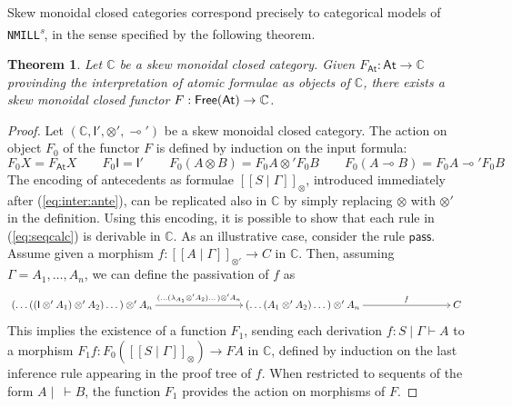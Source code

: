 \documentclass[submission,copyright,creativecommons]{eptcs}
\newtheorem{theorem}{Theorem}[section]
\theoremstyle{definition}
\newcommand{\ldbc}{[\![}
\newcommand{\rdbc}{]\!]}
\newcommand{\pass}{\mathsf{pass}}
\newcommand{\ot}{\otimes}
\newcommand{\lolli}{\multimap}
\newcommand{\I}{\mathsf{I}}
\newcommand{\NMILL}{\texttt{NMILL}}
\newcommand{\SkNMILL}{\NMILL\textsuperscript{\textit{s}}}
\newcommand{\FSkMCC}{\textsf{Free}}
\begin{document}
Skew monoidal closed categories correspond precisely to categorical models of \SkNMILL, in the sense specified by the following theorem.
\begin{theorem}\label{thm:models}
  Let $\mathbb{C}$ be a skew monoidal closed category. Given $F_{\mathsf{At}} : \mathsf{At} \rightarrow \mathbb{C}$ provinding the interpretation of atomic formulae as objects of $\mathbb{C}$, there exists a skew monoidal closed functor $F : \text{\FSkMCC}(\mathsf{At}) \rightarrow \mathbb{C}$.
\end{theorem}
\begin{proof}
  Let $(\mathbb{C} , \I' , \ot' , \lolli')$ be a skew monoidal closed category.
  The action on object $F_0$ of the functor $F$ is defined by induction on the input formula:
  \begin{equation*}
    F_0X = F_{\mathsf{At}}X
    \qquad
    F_0\I = \I'
    \qquad
    F_0(A \ot B) = F_0A \ot' F_0B
    \qquad
    F_0(A \lolli B) = F_0A \lolli' F_0B
  \end{equation*}
  The encoding of antecedents as formulae $\ldbc S \mid \Gamma \rdbc_{\ot}$, introduced immediately after (\ref{eq:inter:ante}), can be replicated also in $\mathbb{C}$ by simply replacing $\ot$ with $\ot'$ in the definition. Using this encoding, it is possible to show that each rule in (\ref{eq:seqcalc}) is derivable in $\mathbb{C}$. As an illustrative case, consider the rule $\pass$. Assume given a morphism $f : \ldbc A \mid \Gamma \rdbc_{\ot'} \to C$ in $\mathbb{C}$. Then, assuming $\Gamma = A_1,\dots,A_n$, we can define the passivation of $f$ as
\[\xymatrixcolsep{7pc}
\xymatrix{
  (\dots ((\I \ot' A_1) \ot' A_2) \dots ) \ot' A_n
  \ar[r]^-{(\dots (\lambda_{A_1} \ot' A_2) \dots ) \ot' A_n} &
  (\dots (A_1 \ot' A_2) \dots ) \ot' A_n
  \ar[r]^-{f} &
  C
}
\]
This implies the existence of a function $F_1$, sending each derivation $f : S \mid \Gamma \vdash A$ to a morphism $F_1f : F_0(\ldbc S \mid \Gamma \rdbc_{\ot}) \to FA$ in $\mathbb{C}$, defined by induction on the last inference rule appearing in the proof tree of $f$. When restricted to sequents of the form $A \mid ~ \vdash B$, the function $F_1$ provides the action on morphisms of $F$.

\end{proof}
\end{document}
